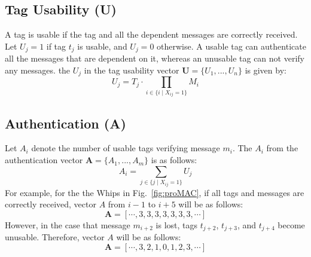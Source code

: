 \subsection*{\textbf{Tag Usability (U)}}
A tag is usable if the tag and all the dependent messages are correctly received. Let $U_j = 1$ if tag $t_j$ is usable, and $U_j = 0$ otherwise. A usable tag can authenticate all the messages that are dependent on it, whereas an unusable tag can not verify any messages. the $U_j$ in the tag usability vector \( \textbf{U} =  \{U_1, ..., U_n\}\) is given by:
\begin{equation}    
U_j = T_j \cdot \prod_{i \in \{i \mid X_{ij} = 1\}} M_i
\end{equation}

\subsection*{\textbf{Authentication (A)}}
Let $A_i$ denote the number of usable tags verifying message $m_i$. The $A_i$ from the authentication vector $\textbf{A} = \{A_1, ..., A_m\}$ is as follows:
\begin{equation}
    A_i =  \sum_{j \in \{j \mid X_{ij} = 1\}} U_j 
\end{equation}
For example, for the the Whips in Fig.~\ref{fig:proMAC}, if all tags and messages are correctly received, vector \( A \) from \( i-1 \) to \( i+5 \) will be as follows:
\begin{equation}
    \textbf{A} = [\cdots, 3, 3, 3, 3, 3, 3, 3, \cdots]
\end{equation} 
However, in the case that message \( m_{i+2} \) is lost, tags \( t_{j+2} \), \( t_{j+3} \), and \( t_{j+4} \) become unusable. Therefore, vector \( A \) will be as follows:
\begin{equation}\label{proMAC_packetLoss_example}
    \textbf{A} = [\cdots, 3, 2, 1, 0, 1, 2, 3, \cdots]
\end{equation}

